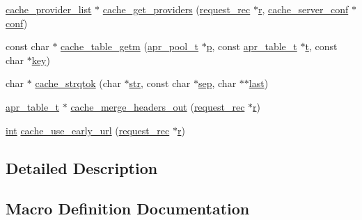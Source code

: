 \begin{DoxyCompactItemize}
\item 
\hyperlink{structcache__provider__list}{cache\+\_\+provider\+\_\+list} $\ast$ \hyperlink{group__Cache__util_ga3bb0227007e96351ef9b155cd0720abb}{cache\+\_\+get\+\_\+providers} (\hyperlink{structrequest__rec}{request\+\_\+rec} $\ast$\hyperlink{pcregrep_8txt_a2e9e9438b26c0bb4425367a7e4f75eb3}{r}, \hyperlink{structcache__server__conf}{cache\+\_\+server\+\_\+conf} $\ast$\hyperlink{group__MOD__PROXY_ga4d7edd451c4bb8ed9ce9012e5dea2b14}{conf})
\item 
const char $\ast$ \hyperlink{group__Cache__util_ga46b2ea303b9ec2767a61d0f121835b43}{cache\+\_\+table\+\_\+getm} (\hyperlink{structapr__pool__t}{apr\+\_\+pool\+\_\+t} $\ast$\hyperlink{group__APACHE__CORE__MPM_ga5cd91701e5c167f2b1a38e70ab57817e}{p}, const \hyperlink{structapr__table__t}{apr\+\_\+table\+\_\+t} $\ast$\hyperlink{pcretest_8txt_a9ffb27fb8e1f90c17b13303fee2fb883}{t}, const char $\ast$\hyperlink{apr__siphash_8h_adac0b6a30345ea1d0daa8a692b0b7ad9}{key})
\item 
char $\ast$ \hyperlink{group__Cache__util_gada03570414af2b2d9349449858036d90}{cache\+\_\+strqtok} (char $\ast$\hyperlink{group__APR__Util__Bucket__Brigades_ga6a62b60443be1d042194af15ce934193}{str}, const char $\ast$\hyperlink{group__apr__tables_ga37d96adf842aef6b03690e17874c9ed8}{sep}, char $\ast$$\ast$\hyperlink{group__apr__strings_ga882d08c2e3ad3004cdfc219601ebaac8}{last})
\item 
\hyperlink{structapr__table__t}{apr\+\_\+table\+\_\+t} $\ast$ \hyperlink{group__Cache__util_ga81c4df4762c014811f81be66e236f62b}{cache\+\_\+merge\+\_\+headers\+\_\+out} (\hyperlink{structrequest__rec}{request\+\_\+rec} $\ast$\hyperlink{pcregrep_8txt_a2e9e9438b26c0bb4425367a7e4f75eb3}{r})
\item 
\hyperlink{pcre_8txt_a42dfa4ff673c82d8efe7144098fbc198}{int} \hyperlink{group__Cache__util_gaea2f7fee82fd07fce89934bee0939987}{cache\+\_\+use\+\_\+early\+\_\+url} (\hyperlink{structrequest__rec}{request\+\_\+rec} $\ast$\hyperlink{pcregrep_8txt_a2e9e9438b26c0bb4425367a7e4f75eb3}{r})
\end{DoxyCompactItemize}


\subsection{Detailed Description}


\subsection{Macro Definition Documentation}

